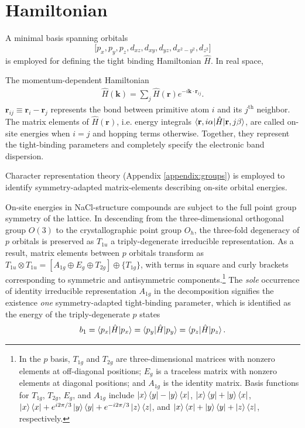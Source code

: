 \documentclass[twocolumn,showpacs,preprintnumbers,superscriptaddress,prb,floatfix,aps,10pt]{revtex4-1}
\renewcommand{\vec}[1]{\ensuremath{\mathbf{#1}}}
\newcommand*{\ham}{\hat{H}}
\newcommand*{\bondvec}{\vec{r}_{ij}}
\begin{document}
\section{Hamiltonian}

A minimal basis spanning orbitals
%
\begin{equation}
\big[ p_{x}, p_{y}, p_{z}, d_{xz}, d_{xy}, d_{yz}, d_{x^2-y^2}, d_{z^2}	\big]
\end{equation}
%
is employed for defining the tight binding Hamiltonian $\ham$. In real space, 





The momentum-dependent Hamiltonian
\begin{align}
\label{eq:matrix_element}
\ham(\vec{k}) = \sum_j \ham(\vec{r}) e^{-i \vec{k}\cdot\vec{r}_{ij}} .
\end{align}
%
$\bondvec \equiv \vec{r}_i - \vec{r}_j$ represents the bond between primitive atom $i$ and its $j^{\textrm{th}}$ neighbor. The matrix elements of $\ham(\vec{r})$, i.e. energy integrals $\braket{\vec{r},i\alpha | \ham | \vec{r},j\beta}$, are called on-site energies when $i=j$ and hopping terms otherwise. Together, they represent the tight-binding parameters and completely specify the electronic band dispersion. 


Character representation theory (Appendix \ref{appendix:groups}) is employed to identify symmetry-adapted matrix-elements describing on-site orbital energies. 

On-site energies in NaCl-structure compounds are subject to the full point group symmetry of the lattice. In descending from the three-dimensional orthogonal group $O(3)$ to the crystallographic point group $O_h$, the three-fold degeneracy of $p$ orbitals is preserved as $T_{1u}$ a triply-degenerate irreducible representation. As a result, matrix elements between $p$ orbitals transform as $T_{1u} \otimes T_{1u} = [A_{1g} \oplus E_g \oplus T_{2g}] \oplus \{T_{1g}\}$, with terms in square and curly brackets corresponding to symmetric and antisymmetric components.\footnote{In the $p$ basis, $T_{1g}$ and $T_{2g}$ are three-dimensional matrices with nonzero elements at off-diagonal positions; $E_g$ is a traceless matrix with nonzero elements at diagonal positions; and $A_{1g}$ is the identity matrix. Basis functions for $T_{1g}$, $T_{2g}$, $E_g$, and $A_{1g}$ include $\ket{x}\bra{y} - \ket{y}\bra{x}$, $\ket{x}\bra{y} + \ket{y}\bra{x}$, $\ket{x}\bra{x} + e^{i2\pi/3}\ket{y}\bra{y} + e^{-i2\pi/3}\ket{z}\bra{z}$, and $\ket{x}\bra{x} + \ket{y}\bra{y} + \ket{z}\bra{z}$, respectively.} The \emph{sole} occurrence of identity irreducible representation $A_{1g}$ in the decomposition signifies the existence \emph{one} symmetry-adapted tight-binding parameter, which is identified as the energy of the triply-degenerate $p$ states
%
\begin{align}
\begin{split}
b_1=\braket{p_x|\ham|p_x}=\braket{p_y|\ham|p_y}=\braket{p_z|\ham|p_z}.
\end{split}
\end{align}
%
\end{document}
